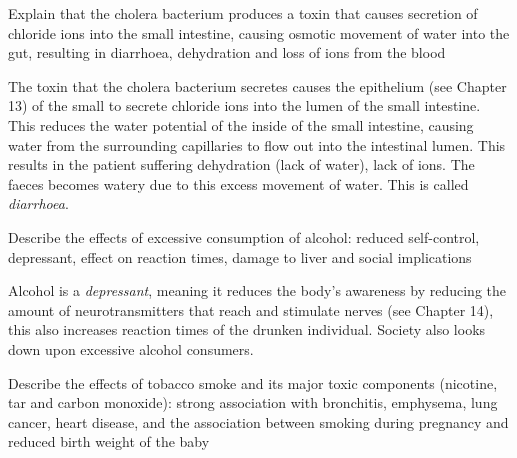 \begin{point}
Explain that the cholera bacterium produces a toxin that causes secretion of chloride ions into the small 
intestine, causing osmotic movement of water into the gut, resulting in diarrhoea, dehydration and loss of 
ions from the blood
\end{point}

The toxin that the cholera bacterium secretes causes the epithelium (see Chapter 13) of the small
to secrete chloride ions into the lumen of the small intestine. This reduces the water potential
of the inside of the small intestine, causing water from the surrounding capillaries to flow out
into the intestinal lumen. This results in the patient suffering dehydration (lack of water), lack
of ions. The faeces becomes watery due to this excess movement of water. This is called
\emph{diarrhoea}.

\begin{point}
Describe the effects of excessive consumption of alcohol: reduced self-control, depressant, effect on 
reaction times, damage to liver and social implications
\end{point}

Alcohol is a \emph{depressant}, meaning it reduces the body's awareness by reducing the amount of
neurotransmitters that reach and stimulate nerves (see Chapter 14), this also increases reaction
times of the drunken individual. Society also looks down upon excessive alcohol consumers.

\begin{point}
Describe the effects of tobacco smoke and its major toxic components (nicotine, tar and carbon 
monoxide): strong association with bronchitis, emphysema, lung cancer, heart disease, and the 
association between smoking during pregnancy and reduced birth weight of the baby
\end{point}

